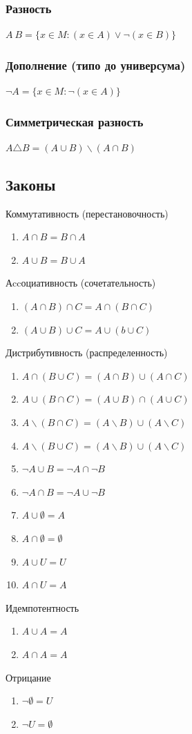 \documentclass[letterpaper]{article}
\begin{document}
\subsubsection{Разность}
\label{sec:orgf6efddb}
\(A \ B = \{x \in M: (x \in A) \lor \neg{(x \in B)}\}\)
\subsubsection{Дополнение (типо до универсума)}
\label{sec:org56d265f}
\(\neg{A} = \{x \in M: \neg{(x \in A)}\}\)
\subsubsection{Симметрическая разность}
\label{sec:orge498a46}
\(A \triangle B = (A \cup B) \backslash (A \cap B)\)
\subsection{Законы}
\label{sec:orgbed5480}
Коммутативность (перестановочность)
\begin{enumerate}
\item \(A \cap B = B \cap A\)
\item \(A \cup B = B \cup A\)
\end{enumerate}
Аccоциативность (сочетательность)
\begin{enumerate}
\item \((A \cap B) \cap C = A \cap (B \cap C)\)
\item \((A \cup B) \cup C = A \cup (b \cup C)\)
\end{enumerate}
Дистрибутивность (распределенность)
\begin{enumerate}
\item \(A \cap (B \cup C) = (A \cap B) \cup (A \cap C)\)
\item \(A \cup (B \cap C) = (A \cup B) \cap (A \cup C)\)
\item \(A \backslash (B \cap C) = (A \backslash B) \cup (A \backslash C)\)
\item \(A \backslash (B \cup C) = (A \backslash B) \cup (A \backslash C)\)
\item \(\neg{A \cup B} = \neg{A} \cap \neg{B}\)
\item \(\neg{A \cap B} = \neg{A} \cup \neg{B}\)
\item \(A \cup \emptyset = A\)
\item \(A \cap \emptyset = \emptyset\)
\item \(A \cup U = U\)
\item \(A \cap U = A\)
\end{enumerate}
Идемпотентность
\begin{enumerate}
\item \(A \cup A = A\)
\item \(A \cap A = A\)
\end{enumerate}
Отрицание
\begin{enumerate}
\item \(\neg{\emptyset} = U\)
\item \(\neg{U} = \emptyset\)
\end{enumerate}
\end{document}
